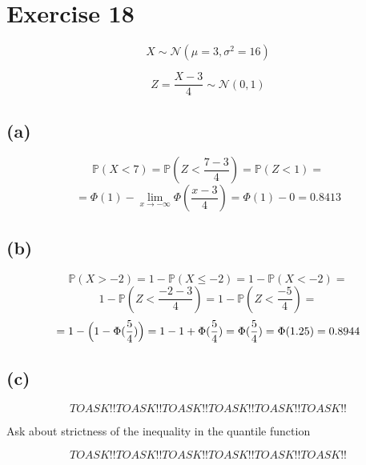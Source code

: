 \documentclass{article}
\begin{document}
\section*{Exercise 18}

\begin{equation*}
    X \sim \mathcal{N}(\mu = 3, \sigma^2 = 16)
\end{equation*}

\begin{equation*}
    Z = \frac{X - 3}{4} \sim \mathcal{N}(0, 1)
\end{equation*}

\subsection*{(a)}

\begin{equation*}
    \mathds{P}(X < 7) = \mathds{P}(Z < \frac{7 - 3}{4}) =  \mathds{P}(Z < 1) = 
\end{equation*}
\begin{equation*}
    = \Phi(1) - \lim_{x \to -\infty}\Phi(\frac{x - 3}{4}) = \Phi(1) - 0 = 0.8413
\end{equation*}


\subsection*{(b)}

\begin{equation*}
    \mathds{P}(X > -2) = 1 - \mathds{P}(X \leq -2) = 1 - \mathds{P}(X < -2) = 
\end{equation*}
\begin{equation*}
    1 - \mathds{P}(Z < \frac{-2 - 3}{4}) = 1 - \mathds{P}(Z < \frac{-5}{4}) = 
\end{equation*}
\begin{equation*}
   = 1 - \Bigl(1 - \Phi(\frac{5}{4})\Bigr) = 1 - 1 + \Phi(\frac{5}{4}) = \Phi(\frac{5}{4}) = \Phi(1.25) = 0.8944
\end{equation*}

\subsection*{(c)}


\begin{equation*}
    TOASK!!TOASK!!TOASK!!TOASK!!TOASK!!TOASK!!
\end{equation*}
\begin{center}
    Ask about strictness of the inequality in the quantile function 
\end{center}
\begin{equation*}
    TOASK!!TOASK!!TOASK!!TOASK!!TOASK!!TOASK!!
\end{equation*}
\end{document}
